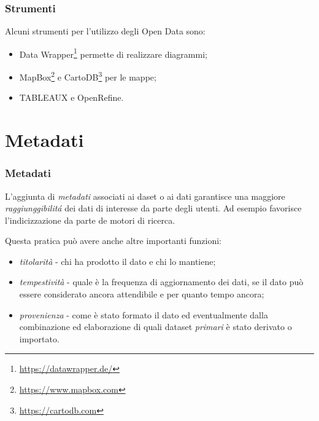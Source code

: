 \documentclass[8pt]{beamer}
\begin{document}
\begin{frame}
\frametitle{Strumenti}

Alcuni strumenti per l'utilizzo degli Open Data sono:
\vspace{\baselineskip}

\begin{itemize}
 \item Data Wrapper\footnote{\url{https://datawrapper.de/}} permette di realizzare diagrammi; 
 \item MapBox\footnote{\url{https://www.mapbox.com}} e CartoDB\footnote{\url{https://cartodb.com}} per le mappe;
 \item TABLEAUX e OpenRefine.
\end{itemize}

\end{frame}

\section{Metadati}

\begin{frame}
  \frametitle{Metadati}
  L'aggiunta di \emph{metadati} associati ai daset o ai dati garantisce una maggiore
  \emph{raggiunggibilit\'a} dei dati di interesse da parte degli utenti. Ad esempio
  favorisce l'indicizzazione da parte de motori di ricerca.
  \vspace{\baselineskip}
  
  Questa pratica pu\`o avere anche altre importanti funzioni:
  \begin{itemize}[<+->]
   \item \emph{titolarit\`a} - chi ha prodotto il dato e chi lo mantiene;
   \item \emph{tempestivit\`a} - quale \`e la frequenza di aggiornamento dei dati, se il dato pu\`o essere
   considerato ancora attendibile e per quanto tempo ancora;
   \item \emph{provenienza} - come \`e stato formato il dato ed eventualmente dalla combinazione ed elaborazione
   di quali dataset \emph{primari} \`e stato derivato o importato. 
  \end{itemize}


\end{frame}
\end{document}
